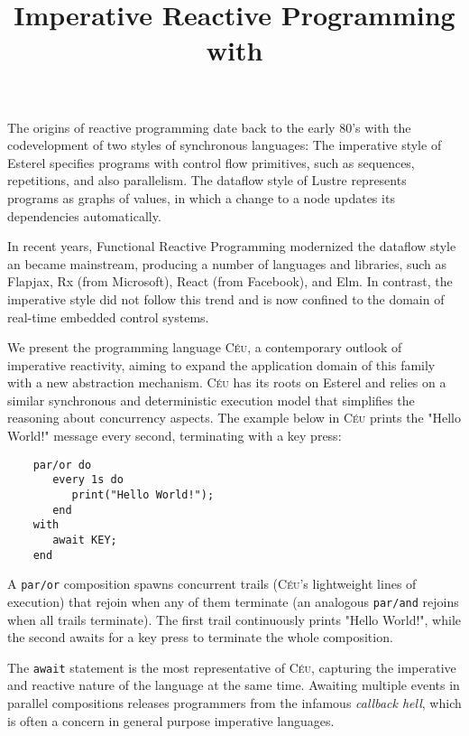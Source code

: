\documentclass[11pt,a4paper]{article}
\title{
    Imperative Reactive Programming with \CEU
}
\newcommand{\CEU}{\textsc{C\'{e}u}\xspace}
\newcommand{\code}[1] {{\small{\texttt{#1}}}}
\begin{document}
\maketitle


The origins of reactive programming date back to the early 80's with the 
codevelopment of two styles of synchronous languages:
%
The imperative style of Esterel specifies programs with control flow 
primitives, such as sequences, repetitions, and also parallelism.
%
The dataflow style of Lustre represents programs as graphs of values, in which 
a change to a node updates its dependencies automatically.

In recent years, Functional Reactive Programming modernized the dataflow style 
an became mainstream, producing a number of languages and libraries, such as
Flapjax, Rx (from Microsoft), React (from Facebook), and Elm.
%
In contrast, the imperative style did not follow this trend and is now confined 
to the domain of real-time embedded control systems.

We present the programming language \CEU, a contemporary outlook of imperative 
reactivity, aiming to expand the application domain of this family with a new 
abstraction mechanism.
%
\CEU has its roots on Esterel and relies on a similar synchronous and 
deterministic execution model that simplifies the reasoning about concurrency 
aspects.
%
%
The example below in \CEU prints the "Hello World!" message every second, 
terminating with a key press:

\begin{verbatim}
    par/or do
       every 1s do
          print("Hello World!");
       end
    with
       await KEY;
    end
\end{verbatim}

A \code{par/or} composition spawns concurrent trails (\CEU's lightweight lines 
of execution) that rejoin when any of them terminate (an analogous 
\code{par/and} rejoins when all trails terminate).
%
The first trail continuously prints "Hello World!", while the second awaits for 
a key press to terminate the whole composition.

The \code{await} statement is the most representative of \CEU, capturing the 
imperative and reactive nature of the language at the same time.
%
Awaiting multiple events in parallel compositions releases programmers from the 
infamous \emph{callback hell}, which is often a concern in general purpose 
imperative languages.
\end{document}
